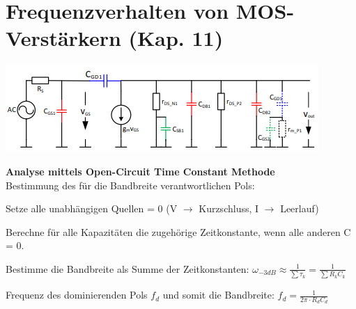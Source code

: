
\section{Frequenzverhalten von MOS-Verstärkern (Kap. 11)}
\begin{minipage}[c]{0.5\textwidth}
	\includegraphics[width=1\linewidth]{chapters/Frequenzverhalten/images/parasitaere_kapazitaeten}
\end{minipage}
\begin{minipage}[c]{0.5\textwidth}
\textbf{Analyse mittels Open-Circuit Time Constant Methode} \\
Bestimmung des für die Bandbreite verantwortlichen Pols:
\begin{compactenum}
	\item Setze alle unabhängigen Quellen = 0 (V $\rightarrow$ Kurzschluss, I $\rightarrow$ Leerlauf)
	\item Berechne für alle Kapazitäten die zugehörige Zeitkonstante, wenn alle anderen C = 0.
\end{compactenum}
\end{minipage}
\begin{compactenum}
	\setcounter{enumi}{2}
	\item Bestimme die Bandbreite als Summe der Zeitkonstanten: $\omega_{-3dB}\approx \frac{1}{\sum\tau_k}=\frac{1}{\sum R_kC_k}$
\end{compactenum}
Frequenz des dominierenden Pols $f_d$ und somit die Bandbreite: $f_d=\frac{1}{2\pi \cdot R_dC_d}$

